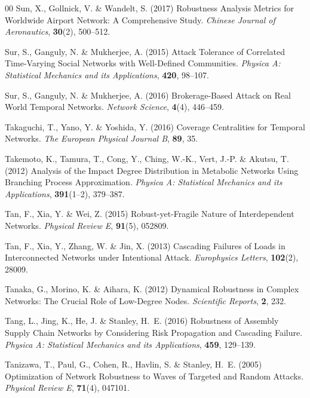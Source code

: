 \documentclass{comnet-mod}
\begin{document}
\begin{thebibliography}{00}
Sun, X., Gollnick, V. {\&} Wandelt, S. (2017)  {Robustness Analysis Metrics for
  Worldwide Airport Network: {{A}} Comprehensive Study}. {\em {Chinese Journal
  of Aeronautics}}, \textbf{30}(2), 500--512.

Sur, S., Ganguly, N. {\&} Mukherjee, A. (2015)  {Attack Tolerance of Correlated
  Time-Varying Social Networks with Well-Defined Communities}. {\em {Physica A:
  Statistical Mechanics and its Applications}}, \textbf{420}, 98--107.

Sur, S., Ganguly, N. {\&} Mukherjee, A. (2016)  {Brokerage-Based Attack on Real
  World Temporal Networks}. {\em {Network Science}}, \textbf{4}(4), 446--459.

Takaguchi, T., Yano, Y. {\&} Yoshida, Y. (2016)  {Coverage Centralities for
  Temporal Networks}. {\em {The European Physical Journal B}}, \textbf{89}, 35.

Takemoto, K., Tamura, T., Cong, Y., Ching, W.-K., Vert, J.-P. {\&} Akutsu, T.
  (2012)  {Analysis of the Impact Degree Distribution in Metabolic Networks
  Using Branching Process Approximation}. {\em {Physica A: Statistical
  Mechanics and its Applications}}, \textbf{391}(1--2), 379--387.

Tan, F., Xia, Y. {\&} Wei, Z. (2015)  {Robust-yet-Fragile Nature of
  Interdependent Networks}. {\em {Physical Review E}}, \textbf{91}(5), 052809.

Tan, F., Xia, Y., Zhang, W. {\&} Jin, X. (2013)  {Cascading Failures of Loads
  in Interconnected Networks under Intentional Attack}. {\em {Europhysics
  Letters}}, \textbf{102}(2), 28009.

Tanaka, G., Morino, K. {\&} Aihara, K. (2012)  {Dynamical Robustness in Complex
  Networks: {{The}} Crucial Role of Low-Degree Nodes}. {\em {Scientific
  Reports}}, \textbf{2}, 232.

Tang, L., Jing, K., He, J. {\&} Stanley, H.~E. (2016)  {Robustness of Assembly
  Supply Chain Networks by Considering Risk Propagation and Cascading Failure}.
  {\em {Physica A: Statistical Mechanics and its Applications}}, \textbf{459},
  129--139.

Tanizawa, T., Paul, G., Cohen, R., Havlin, S. {\&} Stanley, H.~E. (2005)
  {Optimization of Network Robustness to Waves of Targeted and Random Attacks}.
  {\em {Physical Review E}}, \textbf{71}(4), 047101.


\end{thebibliography}
\end{document}
